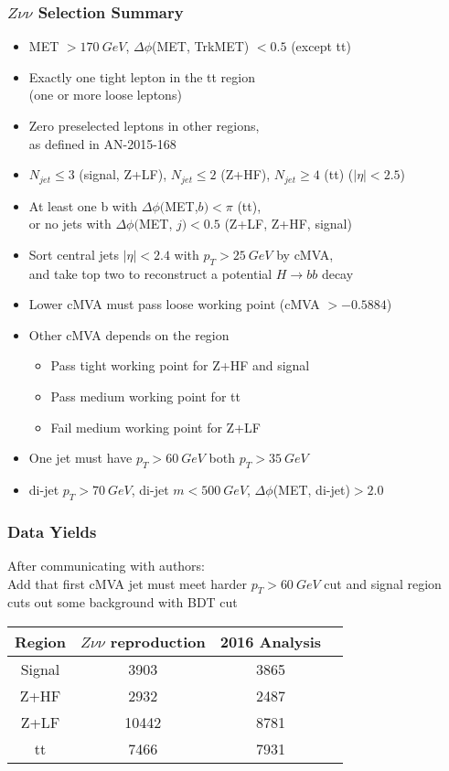 \documentclass{beamer}
\begin{document}
\begin{frame}
  \frametitle{$Z\nu\nu$ Selection Summary}
  \begin{itemize}
  \item MET $> \SI{170}{GeV}$, $\Delta \phi$(MET, TrkMET) $< 0.5$ (except tt)
  \item Exactly one tight lepton in the tt region \\ (one or more loose leptons)
  \item Zero preselected leptons in other regions, \\
    as defined in AN-2015-168
  \item $N_{jet} \le 3$ (signal, Z+LF), $N_{jet} \le 2$ (Z+HF), $N_{jet} \ge 4$ (tt) ($|\eta| < 2.5$)
  \item At least one b with $\Delta \phi($MET,$b) < \pi$ (tt), \\
    or no jets with $\Delta \phi($MET, $j) < 0.5$ (Z+LF, Z+HF, signal)
  \item Sort central jets $|\eta| < 2.4$ with $p_T > \SI{25}{GeV}$ by cMVA, \\
    and take top two to reconstruct a potential $H \rightarrow bb$ decay
  \item Lower cMVA must pass loose working point (cMVA $> -0.5884$)
  \item Other cMVA depends on the region
    \begin{itemize}
    \item Pass tight working point for Z+HF and signal
    \item Pass medium working point for tt
    \item Fail medium working point for Z+LF
    \end{itemize}
  \item One jet must have $p_T > \SI{60}{GeV}$ both $p_T > \SI{35}{GeV}$
  \item di-jet $p_T > \SI{70}{GeV}$, di-jet $m < \SI{500}{GeV}$, $\Delta \phi$(MET, di-jet)$ > 2.0$
  \end{itemize}
\end{frame}

\begin{frame}
  \frametitle{Data Yields}
  After communicating with authors: \\
  Add that first cMVA jet must meet harder $p_T > \SI{60}{GeV}$ cut
  and signal region cuts out some background with BDT cut

  \hspace{24pt}

  \centering
  \begin{tabular}{c c c c}
    Region & $Z\nu\nu$ reproduction & 2016 Analysis \\
    \hline
    Signal & 3903              & 3865          \\
    Z+HF   & 2932              & 2487          \\
    Z+LF   & 10442             & 8781          \\
    tt     & 7466              & 7931
  \end{tabular}

\end{frame}
\end{document}

